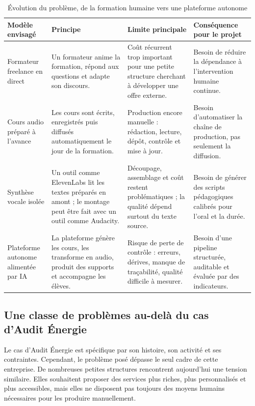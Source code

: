 \begin{table}[h]
\centering
\small
\begin{tabular}{|p{3.1cm}|p{4cm}|p{4cm}|p{3.2cm}|}
\hline
\textbf{Modèle envisagé} & \textbf{Principe} & \textbf{Limite principale} & \textbf{Conséquence pour le projet} \\
\hline
Formateur freelance en direct &
Un formateur anime la formation, répond aux questions et adapte son discours. &
Coût récurrent trop important pour une petite structure cherchant à développer une offre externe. &
Besoin de réduire la dépendance à l'intervention humaine continue. \\
\hline
Cours audio préparé à l'avance &
Les cours sont écrits, enregistrés puis diffusés automatiquement le jour de la formation. &
Production encore manuelle : rédaction, lecture, dépôt, contrôle et mise à jour. &
Besoin d'automatiser la chaîne de production, pas seulement la diffusion. \\
\hline
Synthèse vocale isolée &
Un outil comme ElevenLabs lit les textes préparés en amont ; le montage peut être fait avec un outil comme Audacity. &
Découpage, assemblage et coût restent problématiques ; la qualité dépend surtout du texte source. &
Besoin de générer des scripts pédagogiques calibrés pour l'oral et la durée. \\
\hline
Plateforme autonome alimentée par IA &
La plateforme génère les cours, les transforme en audio, produit des supports et accompagne les élèves. &
Risque de perte de contrôle : erreurs, dérives, manque de traçabilité, qualité difficile à mesurer. &
Besoin d'une pipeline structurée, auditable et évaluée par des indicateurs. \\
\hline
\end{tabular}
\caption{Évolution du problème, de la formation humaine vers une plateforme autonome}
\end{table}

\subsection{Une classe de problèmes au-delà du cas d'Audit Énergie}

Le cas d'Audit Énergie est spécifique par son histoire, son activité et ses contraintes.
Cependant, le problème posé dépasse le seul cadre de cette entreprise. De nombreuses
petites structures rencontrent aujourd'hui une tension similaire. Elles souhaitent proposer
des services plus riches, plus personnalisés et plus accessibles, mais elles ne disposent
pas toujours des moyens humains nécessaires pour les produire manuellement.

